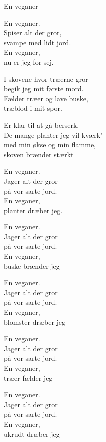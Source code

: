 \begin{song}{En veganer}
  \begin{SBChorus}
    En veganer.\\
    Spiser alt der gror,\\
    svampe med lidt jord.\\
    En veganer,\\
    nu er jeg for sej.
  \end{SBChorus}

  \begin{SBVerse}
    I skovene hvor træerne gror\\
    begik jeg mit første mord.\\
    Fælder træer og lave buske,\\
    træblod i mit spor.
  \end{SBVerse}

  \begin{SBVerse}
    Er klar til at gå berserk.\\
    De mange planter jeg vil kværk'\\
    med min økse og min flamme,\\
    skoven brænder stærkt 
  \end{SBVerse}

  \begin{SBChorus}
    En veganer.\\
    Jager alt der gror\\
    på vor sarte jord.\\
    En veganer,\\
    planter dræber jeg.
  \end{SBChorus}

  \begin{SBChorus}
    En veganer.\\
    Jager alt der gror\\
    på vor sarte jord.\\
    En veganer,\\
    buske brænder jeg
  \end{SBChorus}

  \begin{SBChorus}
    En veganer.\\
    Jager alt der gror\\
    på vor sarte jord.\\
    En veganer,\\
    blomster dræber jeg
  \end{SBChorus}

  \begin{SBChorus}
    En veganer.\\
    Jager alt der gror\\
    på vor sarte jord.\\
    En veganer,\\
    træer fælder jeg
  \end{SBChorus}

  \begin{SBChorus}
    En veganer.\\
    Jager alt der gror\\
    på vor sarte jord.\\
    En veganer,\\
    ukrudt dræber jeg
  \end{SBChorus}
\end{song}
